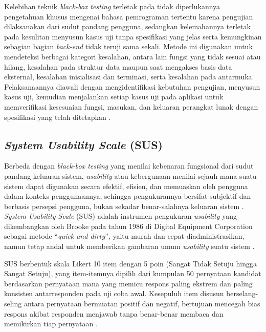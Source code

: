 Kelebihan teknik \textit{black-box testing} terletak pada tidak diperlukannya pengetahuan khusus mengenai bahasa pemrograman tertentu karena pengujian dilaksanakan dari sudut pandang pengguna, sedangkan kelemahannya terletak pada kesulitan menyusun kasus uji tanpa spesifikasi yang jelas serta kemungkinan sebagian bagian \textit{back-end} tidak teruji sama sekali. Metode ini digunakan untuk mendeteksi berbagai kategori kesalahan, antara lain fungsi yang tidak sesuai atau hilang, kesalahan pada struktur data maupun saat mengakses basis data eksternal, kesalahan inisialisasi dan terminasi, serta kesalahan pada antarmuka. Pelaksanaannya diawali dengan mengidentifikasi kebutuhan pengujian, menyusun kasus uji, kemudian menjalankan setiap kasus uji pada aplikasi untuk memverifikasi kesesuaian fungsi, masukan, dan keluaran perangkat lunak dengan spesifikasi yang telah ditetapkan \cite{Lubis_Ginting_2024}.

\subsection{\textit{System Usability Scale} (SUS)}
\label{subsec:teori-sus}
\begin{sloppypar}
Berbeda dengan \textit{black-box testing} yang menilai kebenaran fungsional dari sudut pandang keluaran sistem, \textit{usability} atau kebergunaan menilai sejauh mana suatu sistem dapat digunakan secara efektif, efisien, dan memuaskan oleh pengguna dalam konteks penggunaannya, sehingga pengukurannya bersifat subjektif dan berbasis persepsi pengguna, bukan sekadar benar-salahnya keluaran sistem \cite{Brooke1996}. \textit{System Usability Scale} (SUS) adalah instrumen pengukuran \textit{usability} yang dikembangkan oleh Brooke pada tahun 1986 di Digital Equipment Corporation sebagai metode ``\textit{quick and dirty}'', yaitu murah dan cepat diadministrasikan, namun tetap andal untuk memberikan gambaran umum \textit{usability} suatu sistem \cite{Brooke1996}.
\end{sloppypar}

SUS berbentuk skala Likert 10 item dengan 5 poin (Sangat Tidak Setuju hingga Sangat Setuju), yang item-itemnya dipilih dari kumpulan 50 pernyataan kandidat berdasarkan pernyataan mana yang memicu respons paling ekstrem dan paling konsisten antarresponden pada uji coba awal. Kesepuluh item disusun berselang-seling antara pernyataan bermuatan positif dan negatif, bertujuan mencegah bias respons akibat responden menjawab tanpa benar-benar membaca dan memikirkan tiap pernyataan \cite{Brooke1996}.

